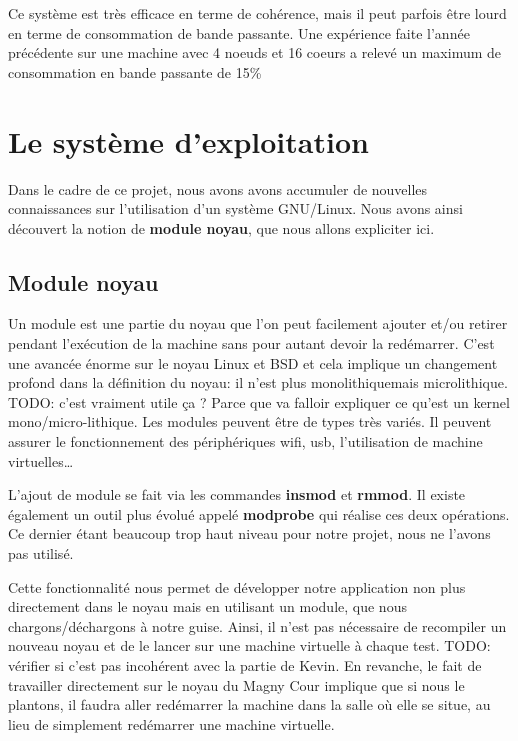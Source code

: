         Ce système est très efficace en terme de cohérence, mais il peut parfois
        être lourd en terme de consommation de bande passante. Une expérience
        faite l'année précédente sur une machine avec 4 noeuds et 16 coeurs a
        relevé un maximum de consommation en bande passante de
        15\%\cite{Lepers2014}

  \section{Le système d'exploitation}

    Dans le cadre de ce projet, nous avons avons accumuler de nouvelles
    connaissances sur l'utilisation d'un système GNU/Linux. Nous avons ainsi
    découvert la notion de \textbf{module noyau}, que nous allons expliciter
    ici.

    \subsection{Module noyau}

      Un module est une partie du noyau que l'on peut facilement ajouter et/ou
      retirer pendant l'exécution de la machine sans pour autant devoir la
      redémarrer. C'est une avancée énorme sur le noyau Linux et BSD et cela
      implique un changement profond dans la définition du noyau: il n'est plus
      \og monolithique\fg mais microlithique. {\color{red}TODO: c'est vraiment
        utile ça ?  Parce que va falloir expliquer ce qu'est un kernel
        mono/micro-lithique.} Les modules peuvent être de types très variés. Il
      peuvent assurer le fonctionnement des périphériques wifi, usb,
      l'utilisation de machine virtuelles\ldots  \newline

      L'ajout de module se fait via les commandes \textbf{insmod} et
      \textbf{rmmod}. Il existe également un outil plus évolué appelé
      \textbf{modprobe} qui réalise ces deux opérations. Ce dernier étant
      beaucoup trop haut niveau pour notre projet, nous ne l'avons pas
      utilisé.\newline

      Cette fonctionnalité nous permet de développer notre application non plus
      directement dans le noyau mais en utilisant un module, que nous
      chargons/déchargons à notre guise. Ainsi, il n'est pas nécessaire de
      recompiler un nouveau noyau et de le lancer sur une machine virtuelle à
      chaque test. {\color{red}TODO: vérifier si c'est pas incohérent avec la
        partie de Kevin.} En revanche, le fait de travailler directement sur le
      noyau du Magny Cour implique que si nous le \og plantons\fg, il faudra
      aller redémarrer la machine dans la salle où elle se situe, au lieu de
      simplement redémarrer une machine virtuelle.

